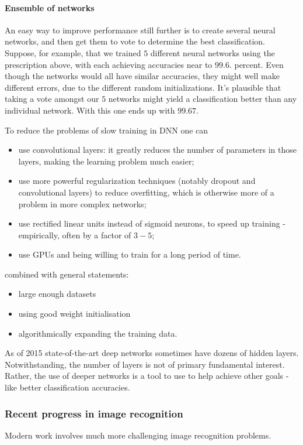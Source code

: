 \documentclass[12pt, letterpaper]{article}
\theoremstyle{definition}
\let\tb\textbf
\begin{document}
\paragraph{\tb{Ensemble of networks}} An easy way to improve performance still further is to create several neural networks, and then get them to vote to determine the best classification. Suppose, for example, that we trained $5$ different neural networks using the prescription above, with each achieving accuracies near to $99.6$. percent. Even though the networks would all have similar accuracies, they might well make different errors, due to the different random initializations. It's plausible that taking a vote amongst our $5$ networks might yield a classification better than any individual network. With this one ends up with $99.67$.

To reduce the problems of slow training  in DNN one can
\begin{itemize}
\item use convolutional layers: it greatly reduces the number of parameters in those layers, making the learning problem much easier; 
\item use more powerful regularization techniques (notably dropout and convolutional layers) to reduce overfitting, which is otherwise more of a problem in more complex networks;
\item use rectified linear units instead of sigmoid neurons, to speed up training - empirically, often by a factor of $3-5$; 
\item use GPUs and being willing to train for a long period of time. 
\end{itemize}
combined with general statements:
\begin{itemize}
\item large enough datasets
\item using good weight initialisation
\item algorithmically expanding the training data.
\end{itemize}

As of 2015 state-of-the-art deep networks sometimes have dozens of hidden layers. Notwithstanding,  the number of layers is not of primary fundamental interest. Rather, the use of deeper networks is a tool to use to help achieve other goals - like better classification accuracies.

\subsubsection{Recent progress in image recognition}
Modern work involves much more challenging image recognition problems.
\end{document}
